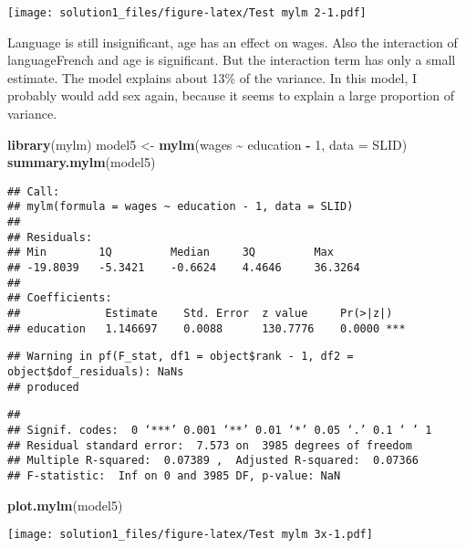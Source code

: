 \documentclass[
]{article}
\newenvironment{Shaded}{\begin{snugshade}}{\end{snugshade}}
\newcommand{\AttributeTok}[1]{\textcolor[rgb]{0.13,0.29,0.53}{#1}}
\newcommand{\DecValTok}[1]{\textcolor[rgb]{0.00,0.00,0.81}{#1}}
\newcommand{\FunctionTok}[1]{\textcolor[rgb]{0.13,0.29,0.53}{\textbf{#1}}}
\newcommand{\NormalTok}[1]{#1}
\newcommand{\OtherTok}[1]{\textcolor[rgb]{0.56,0.35,0.01}{#1}}
\newcommand{\SpecialCharTok}[1]{\textcolor[rgb]{0.81,0.36,0.00}{\textbf{#1}}}
\begin{document}
\texttt{[image: solution1\_files/figure-latex/Test mylm 2-1.pdf]}

Language is still insignificant, age has an effect on wages. Also the
interaction of languageFrench and age is significant. But the
interaction term has only a small estimate. The model explains about
13\% of the variance. In this model, I probably would add sex again,
because it seems to explain a large proportion of variance.

\begin{Shaded}
\begin{Highlighting}[]
\FunctionTok{library}\NormalTok{(mylm)}
\NormalTok{model5 }\OtherTok{\textless{}{-}} \FunctionTok{mylm}\NormalTok{(wages }\SpecialCharTok{\textasciitilde{}}\NormalTok{ education }\SpecialCharTok{{-}} \DecValTok{1}\NormalTok{, }\AttributeTok{data =}\NormalTok{ SLID)}
\FunctionTok{summary.mylm}\NormalTok{(model5)}
\end{Highlighting}
\end{Shaded}

\begin{verbatim}
## Call:
## mylm(formula = wages ~ education - 1, data = SLID)
## 
## Residuals:
## Min        1Q         Median     3Q         Max        
## -19.8039   -5.3421    -0.6624    4.4646     36.3264    
## 
## Coefficients:
##             Estimate    Std. Error  z value     Pr(>|z|)    
## education   1.146697    0.0088      130.7776    0.0000 ***
\end{verbatim}

\begin{verbatim}
## Warning in pf(F_stat, df1 = object$rank - 1, df2 = object$dof_residuals): NaNs
## produced
\end{verbatim}

\begin{verbatim}
## 
## Signif. codes:  0 ‘***’ 0.001 ‘**’ 0.01 ‘*’ 0.05 ‘.’ 0.1 ‘ ’ 1
## Residual standard error:  7.573 on  3985 degrees of freedom 
## Multiple R-squared:  0.07389 ,  Adjusted R-squared:  0.07366 
## F-statistic:  Inf on 0 and 3985 DF, p-value: NaN
\end{verbatim}

\begin{Shaded}
\begin{Highlighting}[]
\FunctionTok{plot.mylm}\NormalTok{(model5)}
\end{Highlighting}
\end{Shaded}

\texttt{[image: solution1\_files/figure-latex/Test mylm 3x-1.pdf]}
\end{document}
